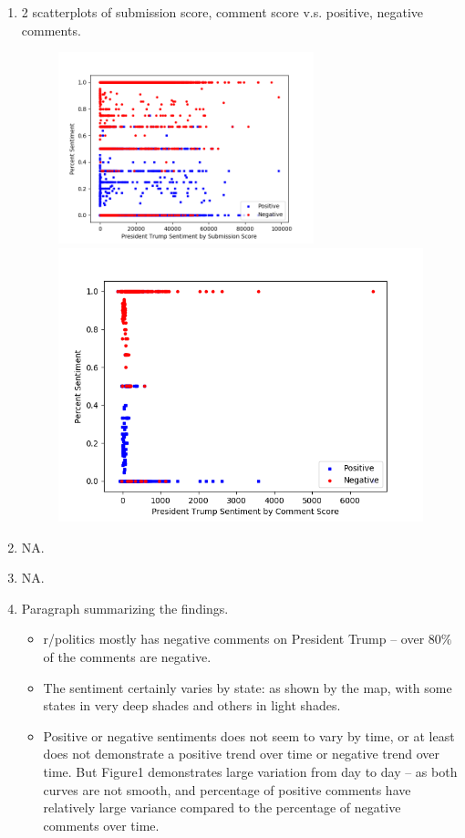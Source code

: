 \documentclass{article}
\begin{document}
\begin{enumerate}
\item 2 scatterplots of submission score, comment score v.s. positive, negative comments.
\begin{figure}[!ht]\centering
\includegraphics[width=0.7\textwidth]{plot5a.png}\\
\includegraphics[width=.7\textwidth]{plot5b.png}
\end{figure}
\newpage
\item NA.
\item NA.
\item Paragraph summarizing the findings.
\begin{itemize}
	\item r/politics mostly has negative comments on President Trump -- over $80\%$ of the comments are negative.
	\item The sentiment certainly varies by state: as shown by the map, with some states in very deep shades and others in light shades. 
	\item Positive or negative sentiments does not seem to vary by time, or at least does not demonstrate a positive trend over time or negative trend over time. But Figure1 demonstrates large variation from day to day -- as both curves are not smooth, and percentage of positive comments have relatively large variance compared to the percentage of negative comments over time.

\end{itemize}
\end{enumerate}
\end{document}
